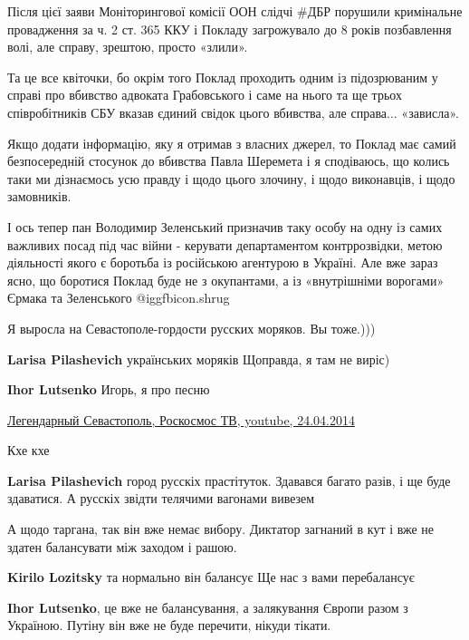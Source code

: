 \begin{itemize}
Після цієї заяви Моніторингової комісії ООН слідчі \#ДБР порушили кримінальне
провадження за ч. 2 ст. 365 ККУ і Покладу загрожувало до 8 років позбавлення
волі, але справу, зрештою, просто «злили».

Та це все квіточки, бо окрім того Поклад проходить одним із підозрюваним у
справі про вбивство адвоката Грабовського і саме на нього та ще трьох
співробітників СБУ вказав єдиний свідок цього вбивства, але справа... «зависла».

Якщо додати інформацію, яку я отримав з власних джерел, то Поклад має самий
безпосередній стосунок до вбивства Павла Шеремета і я сподіваюсь, що колись
таки ми дізнаємось усю правду і щодо цього злочину, і щодо виконавців, і щодо
замовників.

І ось тепер пан Володимир Зеленський призначив таку особу на одну із самих
важливих посад під час війни - керувати департаментом контррозвідки, метою
діяльності якого є боротьба із російською агентурою в Україні. Але вже зараз
ясно, що боротися Поклад буде не з окупантами, а із «внутрішніми ворогами»
Єрмака та Зеленського @igg{fbicon.shrug} 

Я выросла на Севастополе-гордости русских моряков. Вы тоже.)))

\begin{itemize} %
\textbf{Larisa Pilashevich} українських моряків
Щоправда, я там не виріс)

\textbf{Ihor Lutsenko} Игорь, я про песню 

\href{https://youtu.be/F7alZe_Pk3w}{%
Легендарный Севастополь, Роскосмос ТВ, youtube, 24.04.2014%
}

Кхе кхе

\textbf{Larisa Pilashevich} город русскіх прастітуток.
Здавався багато разів, і ще буде здаватися. А русскіх звідти телячими вагонами вивезем

\end{itemize} %


А щодо таргана, так він вже немає вибору. Диктатор загнаний в кут і вже не
здатен балансувати між заходом і рашою.

\begin{itemize} %
\textbf{Kirilo Lozitsky} та нормально він балансує
Ще нас з вами перебалансує

\textbf{Ihor Lutsenko}, це вже не балансування, а залякування Європи разом з Україною. Путіну він вже не буде перечити, нікуди тікати.
\end{itemize} %


\end{itemize}
